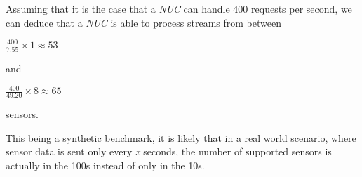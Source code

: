 Assuming that it is the case that a \textit{NUC} can handle 400 requests per second, we can deduce
that a \textit{NUC} is able to process streams from between

$\frac{400}{7.55} \times 1 \approx 53$

and

$\frac{400}{49.20} \times 8 \approx 65$

sensors.

This being a synthetic benchmark, it is likely that in a real world scenario, where sensor data is
sent only every \textit{x} seconds, the number of supported sensors is actually in the 100s instead
of only in the 10s.
